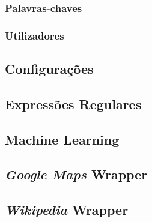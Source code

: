 \documentclass[11pt]{article} %
\begin{document}
\subsubsection{Palavras-chaves}

\subsubsection{Utilizadores}

\subsection{Configurações}

\subsection{Expressões Regulares}

\subsection{Machine Learning}

\subsection{\textit{Google Maps} Wrapper}

\subsection{\textit{Wikipedia} Wrapper}
\end{document}
